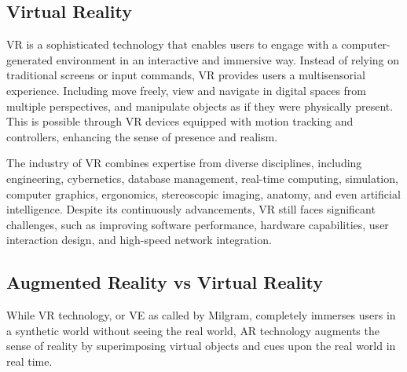 \FloatBarrier

\subsection{Virtual Reality}
\label{sec:virtual_reality}

\gls{VR} is a sophisticated technology that enables users to engage with a computer-generated environment in an interactive and immersive way. Instead of relying on traditional screens or input commands, \gls{VR} provides users a multisensorial experience. Including move freely, view and navigate in digital spaces from multiple perspectives, and manipulate objects as if they were physically present. This is possible through \gls{VR} devices equipped with motion tracking and controllers, enhancing the sense of presence and realism.

The industry of \gls{VR} combines expertise from diverse disciplines, including engineering, cybernetics, database management, real-time computing, simulation, computer graphics, ergonomics, stereoscopic imaging, anatomy, and even artificial intelligence. Despite its continuously advancements, \gls{VR} still faces significant challenges, such as improving software performance, hardware capabilities, user interaction design, and high-speed network integration.



\subsection{Augmented Reality vs Virtual Reality}
\label{sec:mix_reality}

While \gls{VR} technology, or \gls{VE} as called by Milgram, completely immerses users in a synthetic world
without seeing the real world, \gls{AR} technology augments the sense of reality by superimposing virtual objects and cues upon the real world in real time. 


